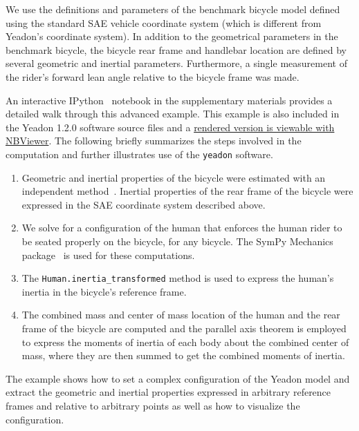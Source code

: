 \documentclass[10pt,a4paper,twocolumn]{article}
\begin{document}
We use the definitions and parameters of the benchmark bicycle model
\cite{Meijaard2007a} defined using the standard SAE vehicle coordinate system (which is different from Yeadon's coordinate system). In addition to the geometrical parameters in the benchmark
bicycle, the bicycle rear frame and handlebar location are
defined by several geometric and inertial parameters.  Furthermore, a single
measurement of the rider's forward lean angle relative to the bicycle frame was
made.

An interactive IPython~\cite{Perez2007} notebook in the supplementary materials
provides a detailed walk through this advanced example. This example is also 
included in the Yeadon 1.2.0 software source files and a \href{http://nbviewer.ipython.org/github/chrisdembia/yeadon/blob/v1.2.0/examples/bicyclerider/bicycle_example.ipynb}{rendered version is viewable with
NBViewer}. The following briefly summarizes the steps
involved in the computation and further illustrates use of the \verb+yeadon+ software.

\begin{enumerate}
  \item Geometric and inertial properties of the bicycle were estimated
    with an independent method~\cite{Moore2012}. Inertial properties of the
    rear frame of the bicycle were expressed in the SAE coordinate system
    described above.
  \item We solve for a configuration of the human that enforces the human rider to be seated properly on the bicycle, for any bicycle. The SymPy
    Mechanics package~\cite{Gede2013} is used for these computations.
  \item The \verb+Human.inertia_transformed+ method is used to express the
    human's inertia in the bicycle's reference frame.
  \item The combined mass and center of mass location of the human and the rear frame of
    the bicycle are computed and the parallel axis theorem is employed to
    express the moments of inertia of each body about the combined center of mass, where
    they are then summed to get the combined moments of inertia.
\end{enumerate}

The example shows how to set a complex configuration of the Yeadon model and
extract the geometric and inertial properties expressed in arbitrary reference frames
and relative to arbitrary points as well as how to visualize the configuration.
\end{document}
